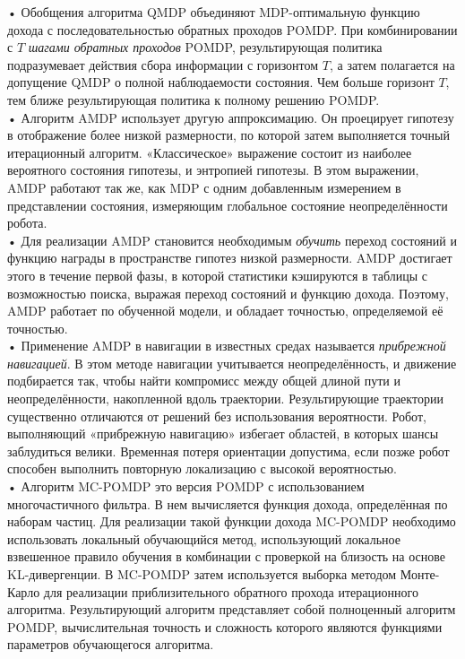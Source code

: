 \documentclass[10pt,a4paper]{article}
\begin{document}
•	Обобщения алгоритма QMDP объединяют MDP-оптимальную функцию дохода с последовательностью обратных проходов POMDP.  При комбинировании с $T$ \textit{шагами обратных проходов} POMDP, результирующая политика подразумевает действия сбора информации с горизонтом $T$, а затем полагается на допущение QMDP о полной наблюдаемости состояния. Чем больше горизонт $T$, тем ближе результирующая политика к полному решению POMDP.\\

•	Алгоритм AMDP использует другую аппроксимацию. Он проецирует гипотезу в отображение более низкой размерности, по которой затем выполняется точный итерационный алгоритм. «Классическое» выражение состоит из наиболее вероятного состояния гипотезы, и энтропией гипотезы. В этом выражении, AMDP работают так же, как MDP с одним добавленным измерением в представлении состояния, измеряющим глобальное состояние неопределённости робота.\\

•	Для реализации AMDP становится необходимым \textit{обучить} переход состояний и функцию награды в пространстве гипотез низкой размерности. AMDP достигает этого в течение первой фазы, в которой статистики кэшируются в таблицы с возможностью поиска, выражая переход состояний и функцию дохода. Поэтому, AMDP работает по обученной модели, и обладает точностью, определяемой её точностью.\\

•	Применение AMDP в навигации в известных средах называется \textit{прибрежной навигацией}. В этом методе навигации учитывается неопределённость,  и движение подбирается так, чтобы найти компромисс между  общей длиной пути и неопределённости, накопленной вдоль траектории. Результирующие траектории существенно отличаются от решений без использования вероятности. Робот, выполняющий «прибрежную навигацию» избегает областей, в которых шансы заблудиться велики. Временная потеря ориентации допустима, если позже робот способен выполнить повторную локализацию с высокой вероятностью.\\

•	Алгоритм MC-POMDP это версия POMDP с использованием многочастичного фильтра. В нем вычисляется функция дохода, определённая по наборам частиц. Для реализации такой функции дохода MC-POMDP необходимо использовать локальный обучающийся метод, использующий локальное взвешенное правило обучения в комбинации с проверкой на близость на основе KL-дивергенции. В MC-POMDP затем используется выборка методом Монте-Карло для реализации приблизительного обратного прохода итерационного алгоритма. Результирующий алгоритм представляет собой полноценный алгоритм POMDP, вычислительная точность и сложность которого являются функциями параметров обучающегося алгоритма.\\
\end{document}

